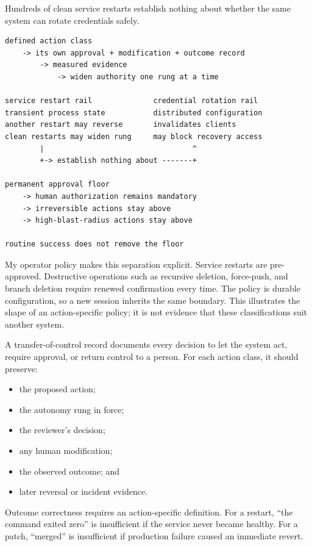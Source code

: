 Hundreds of clean service restarts establish nothing about whether the same system can rotate credentials safely.

\begin{verbatim}
defined action class
    -> its own approval + modification + outcome record
        -> measured evidence
            -> widen authority one rung at a time

service restart rail              credential rotation rail
transient process state           distributed configuration
another restart may reverse       invalidates clients
clean restarts may widen rung     may block recovery access
        |                                  ^
        +-> establish nothing about -------+

permanent approval floor
    -> human authorization remains mandatory
    -> irreversible actions stay above
    -> high-blast-radius actions stay above

routine success does not remove the floor
\end{verbatim}

My operator policy makes this separation explicit. Service restarts are pre-approved. Destructive operations such as recursive deletion, force-push, and branch deletion require renewed confirmation every time. The policy is durable configuration, so a new session inherits the same boundary. This illustrates the shape of an action-specific policy; it is not evidence that these classifications suit another system.


A transfer-of-control record documents every decision to let the system act, require approval, or return control to a person. For each action class, it should preserve:

\begin{itemize}
\tightlist
\item
  the proposed action;
\item
  the autonomy rung in force;
\item
  the reviewer's decision;
\item
  any human modification;
\item
  the observed outcome; and
\item
  later reversal or incident evidence.
\end{itemize}

Outcome correctness requires an action-specific definition. For a restart, ``the command exited zero'' is insufficient if the service never became healthy. For a patch, ``merged'' is insufficient if production failure caused an immediate revert.

